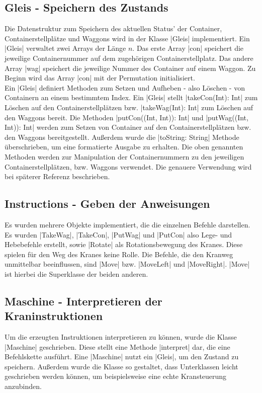 \subsection{Gleis - Speichern des Zustands}
\label{gleis}
Die Datenstruktur zum Speichern des aktuellen Status' der Container, Containerstellplätze und Waggons wird in der Klasse |Gleis| implementiert.
Ein |Gleis| verwaltet zwei Arrays der Länge $n$. Das erste Array |con| speichert die jeweilige Containernummer auf dem zugehörigen Containerstellplatz.
Das andere Array |wag| speichert die jeweilige Nummer des Container auf einem Waggon.
Zu Beginn wird das Array |con| mit der Permutation initialisiert. \\
Ein |Gleis| definiert Methoden zum Setzen und Aufheben - also Löschen - von Containern an einem bestimmtem Index.
Ein |Gleis| stellt |takeCon(Int): Int| zum Löschen auf den Containerstellplätzen bzw. |takeWag(Int): Int| zum Löschen auf den Waggons bereit.
Die Methoden |putCon((Int, Int)): Int| und |putWag((Int, Int)): Int| werden zum Setzen von Container auf den Containerstellplätzen bzw. den Waggons bereitgestellt.
Außerdem wurde die |toString: String| Methode über\-schrie\-ben, um eine formatierte Ausgabe zu erhalten.
Die oben genannten Methoden werden zur Manipulation der Containernummern zu den jeweiligen Containerstellplätzen, bzw. Waggons verwendet.
Die genauere Verwendung wird bei späterer Referenz beschrieben.

\subsection{Instructions - Geben der Anweisungen}
Es wurden mehrere Objekte implementiert, die die einzelnen Befehle darstellen.
Es wurden |TakeWag|, |TakeCon|, |PutWag| und |PutCon| also Lege- und Hebebefehle erstellt, sowie |Rotate| als Rotationsbewegung des Kranes.
Diese spielen für den Weg des Kranes keine Rolle.
Die Befehle, die den Kranweg unmittelbar beeinflussen, sind |Move| bzw. |MoveLeft| und |MoveRight|. |Move| ist hierbei die Superklasse der beiden anderen.

\subsection{Maschine - Interpretieren der Kraninstruktionen}
Um die erzeugten Instruktionen interpretieren zu können, wurde die Klasse |Maschine| geschrieben.
Diese stellt eine Methode |interpret| dar, die eine Befehlskette ausführt.
Eine |Maschine| nutzt ein |Gleis|, um den Zustand zu speichern.
Außerdem wurde die Klasse so gestaltet, dass Unterklassen leicht geschrieben werden können, um beispielsweise eine echte Kransteuerung anzubinden.


